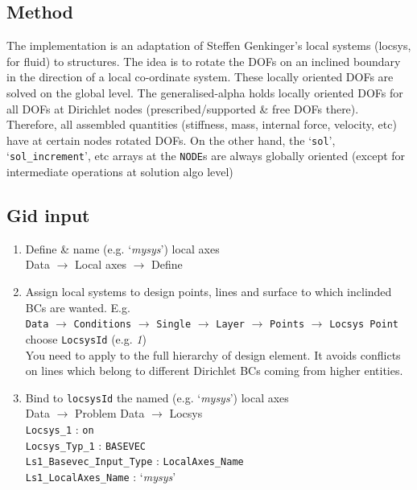 \subsection{Method}
The implementation is an adaptation of Steffen Genkinger's
local systems (locsys, for fluid) to structures.
The idea is to rotate the DOFs on an inclined boundary in the
direction of a local co-ordinate system. These locally oriented
DOFs are solved on the global level. The generalised-alpha holds
locally oriented DOFs for all DOFs at Dirichlet nodes
(prescribed/supported \& free DOFs there). Therefore, all assembled
quantities (stiffness, mass, internal force, velocity, etc) have
at certain nodes rotated DOFs. On the other hand, the `\texttt{sol}', 
`\texttt{sol\_increment}', etc arrays at the \texttt{NODE}s are always globally
oriented (except for intermediate operations at solution algo level)

\subsection{Gid input}
\begin{enumerate}
\item Define \& name (e.g. `\textit{mysys}') local axes\\
       Data $\to$ Local axes $\to$ Define
\item Assign local systems to design points, lines and surface to which
       inclinded BCs are wanted. E.g.\\
       \texttt{Data} $\to$ \texttt{Conditions} $\to$ \texttt{Single} $\to$ \texttt{Layer} $\to$ \texttt{Points} $\to$ \texttt{Locsys Point}\\
       choose \texttt{LocsysId} (e.g. \textit{1})\\
       You need to apply to the full hierarchy
       of design element. It avoids conflicts on lines which belong
       to different Dirichlet BCs coming from higher entities.
\item Bind to \texttt{locsysId} the named  (e.g. `\textit{mysys}') local axes\\
       Data $\to$ Problem Data $\to$ Locsys\\
       \texttt{Locsys\_1} : \texttt{on}\\
       \texttt{Locsys\_Typ\_1} : \texttt{BASEVEC}\\
       \texttt{Ls1\_Basevec\_Input\_Type} : \texttt{LocalAxes\_Name}\\
       \texttt{Ls1\_LocalAxes\_Name} : `\textit{mysys}'\\
\end{enumerate}

